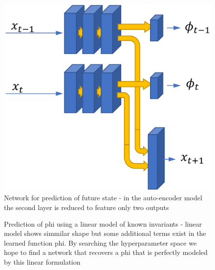 \documentclass[10pt,letterpaper]{report}
\begin{document}
	



\begin{figure}
	\centering
	\includegraphics[width=0.7\linewidth]{./images/predNetwork}
	\caption{Network for prediction of future state - in the auto-encoder model the second layer is reduced to feature only two outputs}
	\label{fig:prednetwork}
\end{figure}



\begin{figure}%
	\centering
	\caption{Prediction of phi using a linear model of known invariants - linear model shows simmilar shape but some additional terms exist in the learned function phi. By searching the hyperparameter space we hope to find a network that recovers a phi that is perfectly modeled by this linear formulation }
	\label{fig:overfit}
\end{figure}
\end{document}
